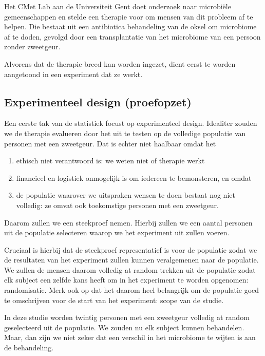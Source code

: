 \documentclass[
  12pt,dutch,coursenotes]{book}
\providecommand{\tightlist}{%
  \setlength{\itemsep}{0pt}\setlength{\parskip}{0pt}}
\theoremstyle{definition}
\theoremstyle{definition}
\theoremstyle{definition}
\theoremstyle{definition}
\theoremstyle{remark}
\begin{document}
Het CMet Lab aan de Universiteit Gent doet onderzoek naar microbiële gemeenschappen en stelde een therapie voor om mensen van dit probleem af te helpen.
Die bestaat uit een antibiotica behandeling van de oksel om microbiome af te doden,
gevolgd door een transplantatie van het microbiome van een persoon zonder zweetgeur.

Alvorens dat de therapie breed kan worden ingezet, dient eerst te worden aangetoond in een experiment dat ze werkt.

\hypertarget{experimenteel-design-proefopzet}{%
\subsection{Experimenteel design (proefopzet)}\label{experimenteel-design-proefopzet}}

Een eerste tak van de statistiek focust op experimenteel design.
Idealiter zouden we de therapie evalueren door het uit te testen op de volledige populatie van personen met een zweetgeur.
Dat is echter niet haalbaar omdat het

\begin{enumerate}
\def\labelenumi{\arabic{enumi}.}
\tightlist
\item
  ethisch niet verantwoord is: we weten niet of therapie werkt
\item
  financieel en logistiek onmogelijk is om iedereen te bemonsteren, en omdat
\item
  de populatie waarover we uitspraken wensen te doen bestaat nog niet volledig: ze omvat ook toekomstige personen met een zweetgeur.
\end{enumerate}

Daarom zullen we een steekproef nemen.
Hierbij zullen we een aantal personen uit de populatie selecteren waarop we het experiment uit zullen voeren.

Cruciaal is hierbij dat de steekproef representatief is voor de populatie zodat we de resultaten van het experiment zullen kunnen veralgemenen naar de populatie. We zullen de mensen daarom volledig at random trekken uit de populatie zodat elk subject een zelfde kans heeft om in het experiment te worden opgenomen: randomisatie.
Merk ook op dat het daarom heel belangrijk om de populatie goed te omschrijven voor de start van het experiment: scope van de studie.

In deze studie worden twintig personen met een zweetgeur volledig at random geselecteerd uit de populatie.
We zouden nu elk subject kunnen behandelen.
Maar, dan zijn we niet zeker dat een verschil in het microbiome te wijten is aan de behandeling.
\end{document}
